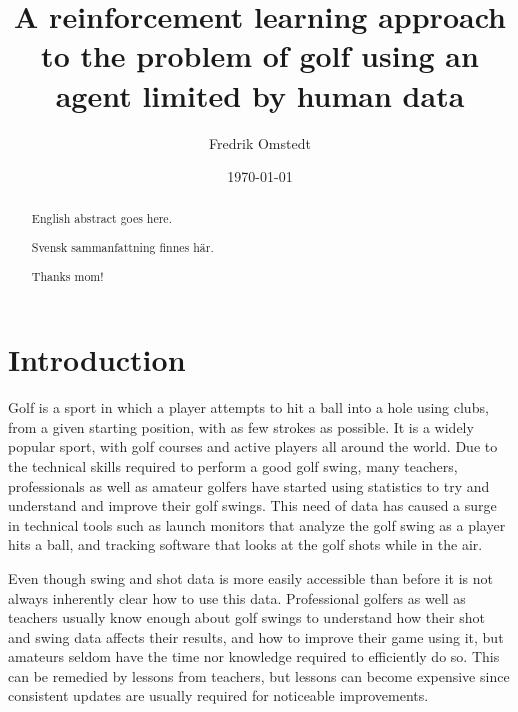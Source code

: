 \documentclass{kththesis}
\title{A reinforcement learning approach to the problem of golf using an agent limited by human data}
\author{Fredrik Omstedt}
\date{\today}
\begin{document}
\frontmatter

\titlepage

\begin{abstract}
English abstract goes here.
\end{abstract}

\begin{otherlanguage}{swedish}
\begin{abstract}
Svensk sammanfattning finnes här.
\end{abstract}
\end{otherlanguage}

\newenvironment{acknowledgements} {\renewcommand\abstractname{Acknowledgements}\begin{abstract}} {\end{abstract}}

\begin{acknowledgements}
Thanks mom!
\end{acknowledgements}

\tableofcontents

\mainmatter


\chapter{Introduction}
\label{chapter:introduction}
Golf is a sport in which a player attempts to hit a ball into a hole using clubs, from a given starting position, with as few strokes as possible. It is a widely popular sport, with golf courses and active players all around the world. Due to the technical skills required to perform a good golf swing, many teachers, professionals as well as amateur golfers have started using statistics to try and understand and improve their golf swings. This need of data has caused a surge in technical tools such as launch monitors that analyze the golf swing as a player hits a ball, and tracking software that looks at the golf shots while in the air. 

Even though swing and shot data is more easily accessible than before it is not always inherently clear how to use this data. Professional golfers as well as teachers usually know enough about golf swings to understand how their shot and swing data affects their results, and how to improve their game using it, but amateurs seldom have the time nor knowledge required to efficiently do so. This can be remedied by lessons from teachers, but lessons can become expensive since consistent updates are usually required for noticeable improvements. 
\end{document}

